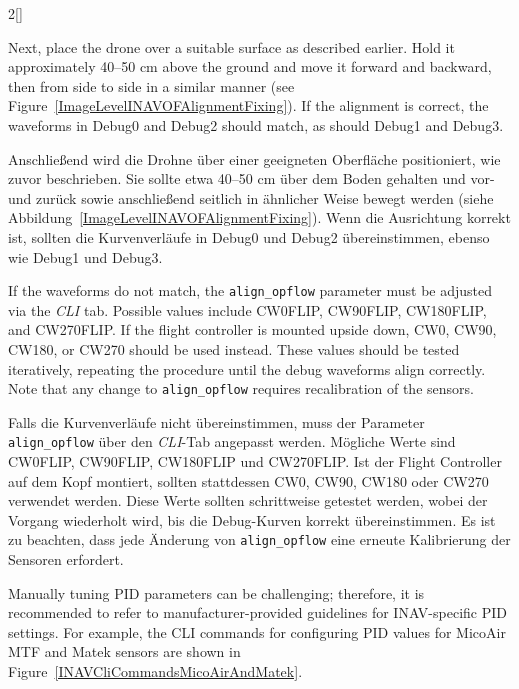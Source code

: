 \begin{paracol}{2}[]
\colstart

Next, place the drone over a suitable surface as described earlier. Hold it approximately 40--50 cm above the ground and move it forward and backward, then from side to side in a similar manner (see Figure~\ref{ImageLevelINAVOFAlignmentFixing}). If the alignment is correct, the waveforms in Debug0 and Debug2 should match, as should Debug1 and Debug3.

\colger

Anschließend wird die Drohne über einer geeigneten Oberfläche positioniert, wie zuvor beschrieben. Sie sollte etwa 40--50 cm über dem Boden gehalten und vor- und zurück sowie anschließend seitlich in ähnlicher Weise bewegt werden (siehe Abbildung~\ref{ImageLevelINAVOFAlignmentFixing}). Wenn die Ausrichtung korrekt ist, sollten die Kurvenverläufe in Debug0 und Debug2 übereinstimmen, ebenso wie Debug1 und Debug3.

\coleng

If the waveforms do not match, the \verb!align_opflow! parameter must be adjusted via the \textsl{CLI} tab. Possible values include CW0FLIP, CW90FLIP, CW180FLIP, and CW270FLIP. If the flight controller is mounted upside down, CW0, CW90, CW180, or CW270 should be used instead. These values should be tested iteratively, repeating the procedure until the debug waveforms align correctly. Note that any change to \verb!align_opflow! requires recalibration of the sensors.

\colger

Falls die Kurvenverläufe nicht übereinstimmen, muss der Parameter \verb!align_opflow! über den \textsl{CLI}-Tab angepasst werden. Mögliche Werte sind CW0FLIP, CW90FLIP, CW180FLIP und CW270FLIP. Ist der Flight Controller auf dem Kopf montiert, sollten stattdessen CW0, CW90, CW180 oder CW270 verwendet werden. Diese Werte sollten schrittweise getestet werden, wobei der Vorgang wiederholt wird, bis die Debug-Kurven korrekt übereinstimmen. Es ist zu beachten, dass jede Änderung von \verb!align_opflow! eine erneute Kalibrierung der Sensoren erfordert.

\colende

\renewcommand{\deutschertitel}{Konfigurationsschritt D: PID-Einstellungen}
\renewcommand{\englischertitel}{Configuration Step D: PID Settings}
\makrounterunterabschnitt

Manually tuning PID parameters can be challenging; therefore, it is recommended to refer to manufacturer-provided guidelines for INAV-specific PID settings. For example, the CLI commands for configuring PID values for MicoAir MTF and Matek sensors are shown in Figure~\ref{INAVCliCommandsMicoAirAndMatek}.


\end{paracol}
